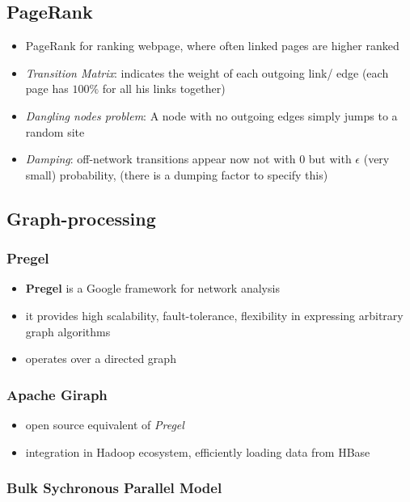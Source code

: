 \documentclass[a4paper]{article}
\begin{document}
\begin{multicols}{3}
\subsection{PageRank}
\begin{itemize}
    \item PageRank for ranking webpage, where often linked pages are higher ranked
    \item \textit{Transition Matrix}: indicates the weight of each outgoing link/ edge (each page has $100\%$ for all his links together) 
    \item \textit{Dangling nodes problem}: A node with no outgoing edges simply jumps to a random site
    \item \textit{Damping}: off-network transitions appear now not with $0$ but with $\epsilon$ (very small) probability, (there is a dumping factor to specify this)
\end{itemize}

\subsection{Graph-processing}
\subsubsection{Pregel}
\begin{itemize}
    \item \textbf{Pregel} is a Google framework for network analysis
    \item it provides high scalability, fault-tolerance, flexibility in expressing arbitrary graph algorithms
    \item operates over a directed graph
\end{itemize}

\subsubsection{Apache Giraph}
\begin{itemize}
    \item open source equivalent of \textit{Pregel}
    \item integration in Hadoop ecosystem, efficiently loading data from HBase
\end{itemize}

\subsubsection{Bulk Sychronous Parallel Model}


\end{multicols}
\end{document}
